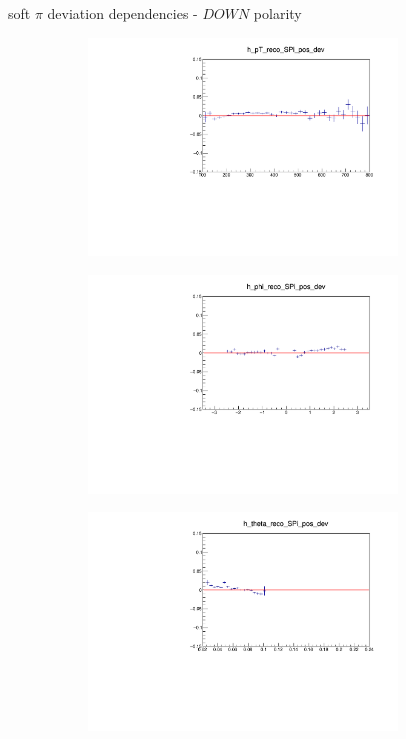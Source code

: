 \documentclass[11pt]{beamer}
\begin{document}
\begin{frame}{soft $\pi$ deviation dependencies - $DOWN$ polarity}
\begin{figure}
\begin{subfigure}{0.45\textwidth}
\includegraphics[width=0.9\textwidth]{sec/down_pdf/deviation/h_pt_reco_SPi_pos_dev.pdf}
\end{subfigure}
\begin{subfigure}{0.45\textwidth}
\includegraphics[width=0.9\textwidth]{sec/down_pdf/deviation/h_phi_reco_SPi_pos_dev.pdf}
\end{subfigure}
\begin{subfigure}{0.45\textwidth}
\includegraphics[width=0.9\textwidth]{sec/down_pdf/deviation/h_theta_reco_SPi_pos_dev.pdf}

\end{subfigure}
\end{figure}
\end{frame}
\end{document}
